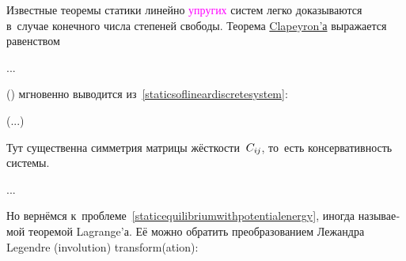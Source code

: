 \begin{otherlanguage}{russian}
Известные теоремы статики линейно \textcolor{magenta}{упругих} систем легко доказываются в~случае конечного числа степеней свободы. Теорема \href{https://en.wikipedia.org/wiki/Beno%C3%AEt_Paul_%C3%89mile_Clapeyron}{Clapeyron’а} выражается равенством

...

 () мгновенно выводится из~\eqref{staticsoflineardiscretesystem}:

(...)

\noindent Тут существенна симметрия матрицы жёсткости~$C_{i\hspace{-0.1ex}j}$, то~есть консервативность системы.

...

Но вернёмся к~проблеме~\eqref{staticequilibriumwithpotentialenergy}, иногда называемой теоремой Lagrange’а. Её можно обратить преобразованием Лежандра Legendre (involution) transform(ation):


\end{otherlanguage}
